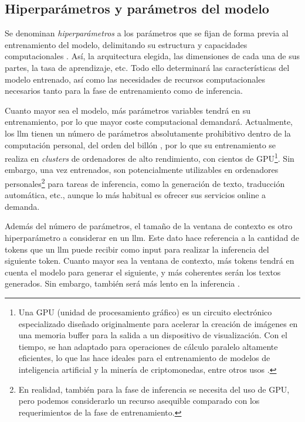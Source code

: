 \subsection{Hiperparámetros y parámetros del modelo}
\label{sec:hiperparametros_ventana}


Se denominan \emph{hiperparámetros} a los parámetros que se fijan de forma previa al entrenamiento del modelo, delimitando su estructura y capacidades computacionales \citep{QueEsAjuste}. Así, la arquitectura elegida, las dimensiones de cada una de sus partes, la tasa de aprendizaje, etc. Todo ello determinará las características del modelo entrenado, así como las necesidades de recursos computacionales necesarios tanto para la fase de entrenamiento como de inferencia.

Cuanto mayor sea el modelo, más parámetros variables tendrá en su entrenamiento, por lo que mayor coste computacional demandará. Actualmente, los \gls{llm} tienen un número de parámetros absolutamente prohibitivo dentro de la computación personal, del orden del billón \citep{radfordLanguageModelsAre2019}, por lo que su entrenamiento se realiza en \emph{clusters} de ordenadores de alto rendimiento, con cientos de GPU\footnote{Una GPU (unidad de procesamiento gráfico) es un circuito electrónico especializado diseñado originalmente para acelerar la creación de imágenes en una memoria buffer para la salida a un dispositivo de visualización. Con el tiempo, se han adaptado para operaciones de cálculo paralelo altamente eficientes, lo que las hace ideales para el entrenamiento de modelos de inteligencia artificial y la minería de criptomonedas, entre otros usos \citep{GPUWikipedia}.}. Sin embargo, una vez entrenados, son potencialmente utilizables en ordenadores personales\footnote{En realidad, también para la fase de inferencia se necesita del uso de GPU, pero podemos considerarlo un recurso asequible comparado con los requerimientos de la fase de entrenamiento.} para tareas de inferencia, como la generación de texto, traducción automática, etc., aunque lo más habitual es ofrecer sus servicios online a demanda.

Además del número de parámetros, el tamaño de la ventana de contexto es otro hiperparámetro a considerar en un \gls{llm}. Este dato hace referencia a la cantidad de {tokens} que un \gls{llm} puede recibir como input para realizar la inferencia del siguiente {token}. Cuanto mayor sea la ventana de contexto, más tokens tendrá en cuenta el modelo para generar el siguiente, y más coherentes serán los textos generados. Sin embargo, también será más lento en la inferencia \citep{gonzaloAsomandonosVentanaContextual2023}.




